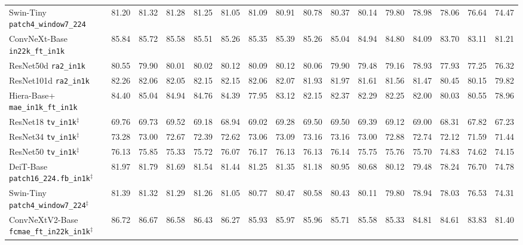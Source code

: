 \documentclass[11pt]{article}
\theoremstyle{plain}
\theoremstyle{definition}
\theoremstyle{remark}
\newcommand{\1}{\mathbf{1}}
\begin{document}
\begin{table}[ht]
\begin{tabular}{lccccccccccccccc}
Swin-Tiny \texttt{patch4\_window7\_224}    & 81.20 & 81.32 & 81.28 & 81.25 & 81.05 & 81.09 & 80.91 & 80.78 & 80.37 & 80.14 & 79.80 & 78.98 & 78.06 & 76.64 & 74.47 \\
ConvNeXt-Base \texttt{in22k\_ft\_in1k}     & 85.84 & 85.72 & 85.58 & 85.51 & 85.26 & 85.35 & 85.39 & 85.26 & 85.04 & 84.94 & 84.80 & 84.09 & 83.70 & 83.11 & 81.21 \\
ResNet50d \texttt{ra2\_in1k}               & 80.55 & 79.90 & 80.01 & 80.02 & 80.12 & 80.09 & 80.12 & 80.06 & 79.90 & 79.48 & 79.16 & 78.93 & 77.93 & 77.25 & 76.32 \\
ResNet101d \texttt{ra2\_in1k}              & 82.26 & 82.06 & 82.05 & 82.15 & 82.15 & 82.06 & 82.07 & 81.93 & 81.97 & 81.61 & 81.56 & 81.47 & 80.45 & 80.15 & 79.82 \\
Hiera-Base+ \texttt{mae\_in1k\_ft\_in1k}   & 84.40 & 85.04 & 84.94 & 84.76 & 84.39 & 77.95\protect\footnotemark & 83.12 & 82.15 & 82.37 & 82.29 & 82.25 & 82.00 & 80.03 & 80.55 & 78.96 \\
ResNet18 \texttt{tv\_in1k}$^{\ddagger}$    & 69.76 & 69.73 & 69.52 & 69.18 & 68.94 & 69.02 & 69.28 & 69.50 & 69.50 & 69.39 & 69.12 & 69.00 & 68.31 & 67.82 & 67.23 \\
ResNet34 \texttt{tv\_in1k}$^{\ddagger}$    & 73.28 & 73.00 & 72.67 & 72.39 & 72.62 & 73.06 & 73.09 & 73.16 & 73.16 & 73.00 & 72.88 & 72.74 & 72.12 & 71.59 & 71.44 \\
ResNet50 \texttt{tv\_in1k}$^{\ddagger}$    & 76.13 & 75.85 & 75.33 & 75.72 & 76.07 & 76.17 & 76.13 & 76.13 & 76.14 & 75.75 & 75.76 & 75.70 & 74.83 & 74.62 & 74.15 \\
DeiT-Base \texttt{patch16\_224.fb\_in1k}$^{\ddagger}$ & 81.97 & 81.79 & 81.69 & 81.54 & 81.44 & 81.25 & 81.35 & 81.18 & 80.95 & 80.68 & 80.12 & 79.48 & 78.24 & 76.70 & 74.78 \\
Swin-Tiny \texttt{patch4\_window7\_224}$^{\ddagger}$ & 81.39 & 81.32 & 81.29 & 81.26 & 81.05 & 80.77 & 80.47 & 80.58 & 80.43 & 80.11 & 79.80 & 78.94 & 78.03 & 76.53 & 74.31 \\
ConvNeXtV2-Base \texttt{fcmae\_ft\_in22k\_in1k}$^{\ddagger}$ & 86.72 & 86.67 & 86.58 & 86.43 & 86.27 & 85.93 & 85.97 & 85.96 & 85.71 & 85.58 & 85.33 & 84.81 & 84.61 & 83.83 & 81.40 \\
\bottomrule
\end{tabular}
\end{table}
\end{document}
